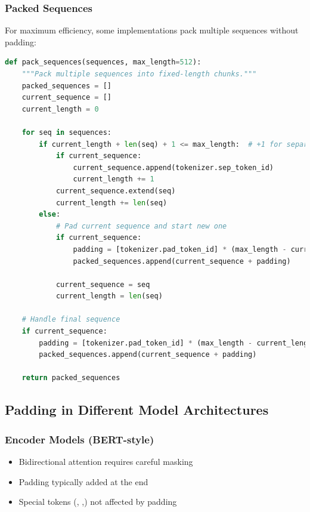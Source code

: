 \subsubsection{Packed Sequences}
For maximum efficiency, some implementations pack multiple sequences without padding:

\begin{lstlisting}[language=Python]
def pack_sequences(sequences, max_length=512):
    """Pack multiple sequences into fixed-length chunks."""
    packed_sequences = []
    current_sequence = []
    current_length = 0
    
    for seq in sequences:
        if current_length + len(seq) + 1 <= max_length:  # +1 for separator
            if current_sequence:
                current_sequence.append(tokenizer.sep_token_id)
                current_length += 1
            current_sequence.extend(seq)
            current_length += len(seq)
        else:
            # Pad current sequence and start new one
            if current_sequence:
                padding = [tokenizer.pad_token_id] * (max_length - current_length)
                packed_sequences.append(current_sequence + padding)
            
            current_sequence = seq
            current_length = len(seq)
    
    # Handle final sequence
    if current_sequence:
        padding = [tokenizer.pad_token_id] * (max_length - current_length)
        packed_sequences.append(current_sequence + padding)
    
    return packed_sequences
\end{lstlisting}

\subsection{Padding in Different Model Architectures}

\subsubsection{Encoder Models (BERT-style)}
\begin{itemize}
\item Bidirectional attention requires careful masking
\item Padding typically added at the end
\item Special tokens (\cls{}, \sep{}) not affected by padding
\end{itemize}

